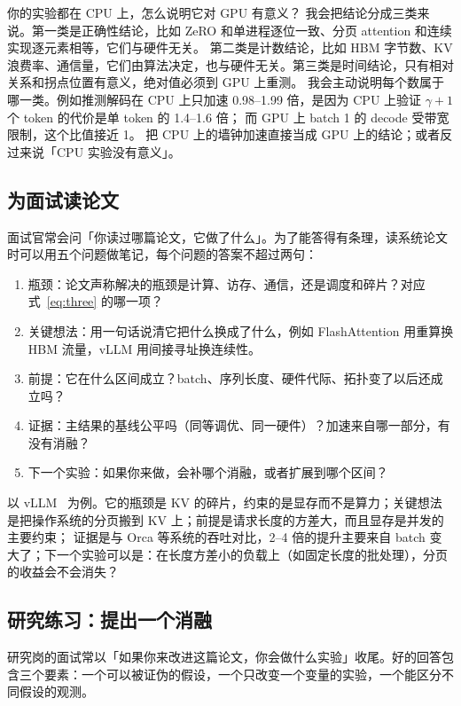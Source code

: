 \begin{qa}{你的实验都在 CPU 上，怎么说明它对 GPU 有意义？}
\ans 我会把结论分成三类来说。第一类是正确性结论，比如 ZeRO 和单进程逐位一致、分页 attention 和连续实现逐元素相等，它们与硬件无关。
第二类是计数结论，比如 HBM 字节数、KV 浪费率、通信量，它们由算法决定，也与硬件无关。第三类是时间结论，只有相对关系和拐点位置有意义，绝对值必须到 GPU 上重测。
我会主动说明每个数属于哪一类。例如推测解码在 CPU 上只加速 0.98--1.99 倍，是因为 CPU 上验证 $\gamma+1$ 个 token 的代价是单 token 的 1.4--1.6 倍；
而 GPU 上 batch 1 的 decode 受带宽限制，这个比值接近 1。
\wrong 把 CPU 上的墙钟加速直接当成 GPU 上的结论；或者反过来说「CPU 实验没有意义」。
\end{qa}

\subsection{为面试读论文}

面试官常会问「你读过哪篇论文，它做了什么」。为了能答得有条理，读系统论文时可以用五个问题做笔记，每个问题的答案不超过两句：
\begin{enumerate}
\item 瓶颈：论文声称解决的瓶颈是计算、访存、通信，还是调度和碎片？对应式~\eqref{eq:three} 的哪一项？
\item 关键想法：用一句话说清它把什么换成了什么，例如 FlashAttention 用重算换 HBM 流量，vLLM 用间接寻址换连续性。
\item 前提：它在什么区间成立？batch、序列长度、硬件代际、拓扑变了以后还成立吗？
\item 证据：主结果的基线公平吗（同等调优、同一硬件）？加速来自哪一部分，有没有消融？
\item 下一个实验：如果你来做，会补哪个消融，或者扩展到哪个区间？
\end{enumerate}
以 vLLM~\cite{kwon2023vllm} 为例。它的瓶颈是 KV 的碎片，约束的是显存而不是算力；关键想法是把操作系统的分页搬到 KV 上；前提是请求长度的方差大，而且显存是并发的主要约束；
证据是与 Orca 等系统的吞吐对比，2--4 倍的提升主要来自 batch 变大了；下一个实验可以是：在长度方差小的负载上（如固定长度的批处理），分页的收益会不会消失？

\subsection{研究练习：提出一个消融}

研究岗的面试常以「如果你来改进这篇论文，你会做什么实验」收尾。好的回答包含三个要素：一个可以被证伪的假设，一个只改变一个变量的实验，一个能区分不同假设的观测。

